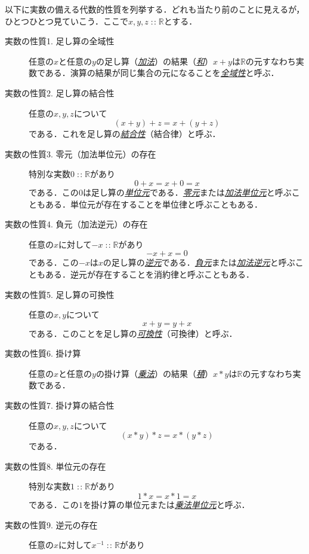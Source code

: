 \documentclass[a5paper,draft]{jsbook}
\newcommand{\keyword}[1]{{\underline{\emph{#1}}}}
\newcommand{\mathSpecialSet}[1]{\mathbb{#1}} %
\newcommand{\mathBinaryOperator}[1]{\operatorname{#1}}
\newcommand{\mathIn}{\mathBinaryOperator{:\!:}}
\begin{document}
以下に実数の備える代数的性質を列挙する．どれも当たり前のことに見えるが，ひとつひとつ見ていこう．ここで$x,y,z\mathIn\mathSpecialSet{R}$とする．
\begin{description}
\item[実数の性質1. 足し算の全域性] 任意の$x$と任意の$y$の足し算（\keyword{加法}）の結果（\keyword{和}）$x+y$は$\mathSpecialSet{R}$の元すなわち実数である．演算の結果が同じ集合の元になることを\keyword{全域性}と呼ぶ．
\item[実数の性質2. 足し算の結合性] 任意の$x,y,z$について
\begin{equation}
(x+y)+z=x+(y+z)
\end{equation}
である．これを足し算の\keyword{結合性}（結合律）と呼ぶ．
\item[実数の性質3. 零元（加法単位元）の存在] 特別な実数$0\mathIn\mathSpecialSet{R}$があり
\begin{equation}
0+x=x+0=x
\end{equation}
である．この$0$は足し算の\keyword{単位元}である．\keyword{零元}または\keyword{加法単位元}と呼ぶこともある．単位元が存在することを単位律と呼ぶこともある．
\item[実数の性質4. 負元（加法逆元）の存在] 任意の$x$に対して$-x\mathIn\mathSpecialSet{R}$があり
\begin{equation}
-x+x=0
\end{equation}
である．この$-x$は$x$の足し算の\keyword{逆元}である．\keyword{負元}または\keyword{加法逆元}と呼ぶこともある．逆元が存在することを消約律と呼ぶこともある．
\item[実数の性質5. 足し算の可換性] 任意の$x,y$について
\begin{equation}
x+y=y+x
\end{equation}
である．このことを足し算の\keyword{可換性}（可換律）と呼ぶ．
\item[実数の性質6. 掛け算] 任意の$x$と任意の$y$の掛け算（\keyword{乗法}）の結果（\keyword{積}）$x*y$は$\mathSpecialSet{R}$の元すなわち実数である．
\item[実数の性質7. 掛け算の結合性] 任意の$x,y,z$について
\begin{equation}
(x*y)*z=x*(y*z)
\end{equation}
である．
\item[実数の性質8. 単位元の存在] 特別な実数$1\mathIn\mathSpecialSet{R}$があり
\begin{equation}
1*x=x*1=x
\end{equation}
である．この$1$を掛け算の単位元または\keyword{乗法単位元}と呼ぶ．
\item[実数の性質9. 逆元の存在] 任意の$x$に対して$x^{-1}\mathIn\mathSpecialSet{R}$があり

\end{description}
\end{document}
